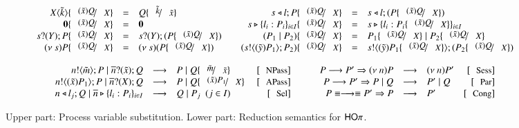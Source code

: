 \begin{figure}[t!]
\[
	\begin{array}{c}
		\begin{array}{rclcrcl}
			\appl{X}{\tilde{k}} \subst{\abs{\tilde{x}}{Q}}{\X} & = & Q \subst{\tilde{k}}{\tilde{x}}
			& &
			\bsel{s}{l} P \subst{\abs{\tilde{x}}{Q}}{\X} & = & \bsel{s}{l} (P \subst{\abs{\tilde{x}}{Q}}{\X})
			\\

			\inact \subst{\abs{\tilde{x}}{Q}}{\X} & = & \inact
			& &
			\bbra{s}{l_i : P_i}_{i \in I} \subst{\abs{\tilde{x}}{Q}}{\X} & = & \bbra{s}{l_i : P_i \subst{\abs{\tilde{x}}{Q}}{\X}}_{i \in I} 
			\\

			\binp{s}{\Y} P \subst{\abs{\tilde{x}}{Q}}{\X} & = & \binp{s}{\Y} (P \subst{\abs{\tilde{x}}{Q}}{\X})
			& &
			(P_1 \Par P_2) \subst{\abs{\tilde{x}}{Q}}{\X} & = & P_1 \subst{\abs{\tilde{x}}{Q}}{\X} \Par P_2 \subst{\abs{\tilde{x}}{Q}}{\X}
			\\

			\news{s} P \subst{\abs{\tilde{x}}{Q}}{\X} & = & \news{s} (P \subst{\abs{\tilde{x}}{Q}}{\X})
			& &
			(\bout{s}{\abs{\tilde{y}}{P_1}} P_2) \subst{\abs{\tilde{x}}{Q}}{\X} & = & \bout{s}{\abs{\tilde{y}}{P_1 \subst{\abs{\tilde{x}}{Q}}{\X}}} (P_2 \subst{\abs{\tilde{x}}{Q}}{\X})
		\end{array}

		\vspace{4mm}\\

		\begin{array}{rclrcrclr}
			\bout{n}{\tilde{m}} P \Par \binp{\dual{n}}{\tilde{x}} Q & \red & P \Par Q \subst{\tilde{m}}{\tilde{x}} & \orule{NPass}
			& \quad &
			P \red P' \Rightarrow \news{n} P & \red & \news{n} P'  & \orule{Sess}
			\\

			\bout{n}{\abs{\tilde{x}}{P_1}} P \Par \binp{\dual{n}}{\X} Q & \red & P \Par Q \subst{\abs{\tilde{x}}{P_1}}{\X}\ & \orule{APass}
			& &
			P \red P' \Rightarrow   P \Par Q & \red &  P' \Par Q  & \orule{Par}
			\\

			\bsel{n}{l_j} Q \Par \bbra{\dual{n}}{l_i : P_i}_{i \in I} & \red & Q \Par P_j ~~(j \in I)~~  & \orule{Sel}
			& &
			P \scong \red \scong P' \Rightarrow P & \red & P' & \orule{Cong}\\
		\end{array}
	\end{array}
\]
	\caption{Upper part: Process variable substitution. Lower part: Reduction semantics for $\mathsf{HO}\pi$. \label{fig:reduction}}
\end{figure}
